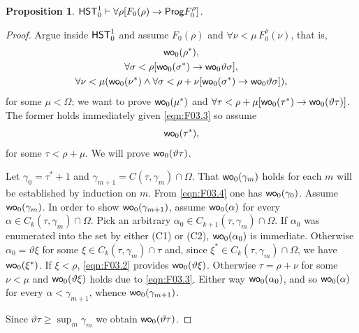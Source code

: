 \documentclass[UKenglish,cleveref,DIV=12]{scrartcl}
\newtheorem{proposition}[lemma]{Proposition}
\theoremstyle{definition}
\theoremstyle{definition}
\begin{document}
\begin{proposition}\label{prop:F0genwellordering}
  $\mathsf{HST}_0^1\vdash \forall\rho[F_0(\rho)\rightarrow \mathsf{Prog}  F_0^\rho]$.
\end{proposition}
\begin{proof}
Argue inside $\mathsf{HST}_0^1$ and assume $F_0(\rho)$ and $\forall\nu<\mu\,F_0^\rho(\nu)$, that is,
\begin{gather}
  \mathsf{wo}_0(\rho^*),\label{eqn:F03.1}\\
  \forall\sigma<\rho[\mathsf{wo}_0(\sigma^*)\rightarrow\mathsf{wo}_0\vartheta\sigma],\label{eqn:F03.2}\\
  \forall\nu<\mu(\mathsf{wo}_0(\nu^*)\land\forall\sigma<\rho+\nu[\mathsf{wo}_0(\sigma^*)\rightarrow \mathsf{wo}_0\vartheta\sigma]),\label{eqn:F03.3}
\end{gather}
for some $\mu<\Omega$; we want to prove $\mathsf{wo}_0(\mu^*)$ and $\forall\tau<\rho+\mu[\mathsf{wo}_0(\tau^*)\rightarrow \mathsf{wo}_0(\vartheta\tau)]$. The former holds immediately given \eqref{eqn:F03.3} so assume
\begin{gather}
  \mathsf{wo}_0(\tau^*),\label{eqn:F03.4}
\end{gather}
for some $\tau<\rho+\mu$. We will prove $\mathsf{wo}_0(\vartheta\tau)$.

Let $\gamma_0=\tau^*+1$ and $\gamma_{m+1} = C(\tau,\gamma_m)\cap \Omega$. That $\mathsf{wo}_0(\gamma_m)$ holds for each $m$ will be established by induction on $m$. From
\eqref{eqn:F03.4} one has $\mathsf{wo}_0(\gamma_0)$. Assume $\mathsf{wo}_0(\gamma_m)$. In
order to show $\mathsf{wo}_0(\gamma_{m+1})$, assume $\mathsf{wo}_0(\alpha)$ for every
$\alpha\in C_k(\tau,\gamma_m)\cap\Omega$. Pick an arbitrary $\alpha_0\in
C_{k+1}(\tau,\gamma_m)\cap\Omega$. If $\alpha_0$ was enumerated into the set by
either (C1) or (C2), $\mathsf{wo}_0(\alpha_0)$ is immediate. Otherwise
$\alpha_0=\vartheta\xi$ for some $\xi\in C_k(\tau,\gamma_m)\cap\tau$ and, since
$\xi^*\in C_k(\tau,\gamma_m)\cap\Omega$, we have $\mathsf{wo}_0(\xi^*)$. If $\xi<\rho$,
\eqref{eqn:F03.2} provides $\mathsf{wo}_0(\vartheta\xi)$. Otherwise $\tau=\rho+\nu$
for some $\nu<\mu$ and $\mathsf{wo}_0(\vartheta\xi)$ holds due to \eqref{eqn:F03.3}.
Either way $\mathsf{wo}_0(\alpha_0)$, and so $\mathsf{wo}_0(\alpha)$ for every
$\alpha<\gamma_{m+1}$, whence $\mathsf{wo}_0(\gamma_{m+1})$.

Since $\vartheta\tau\ge\sup_m\gamma_m$ we obtain $\mathsf{wo}_0(\vartheta\tau)$.
\end{proof}
\end{document}
